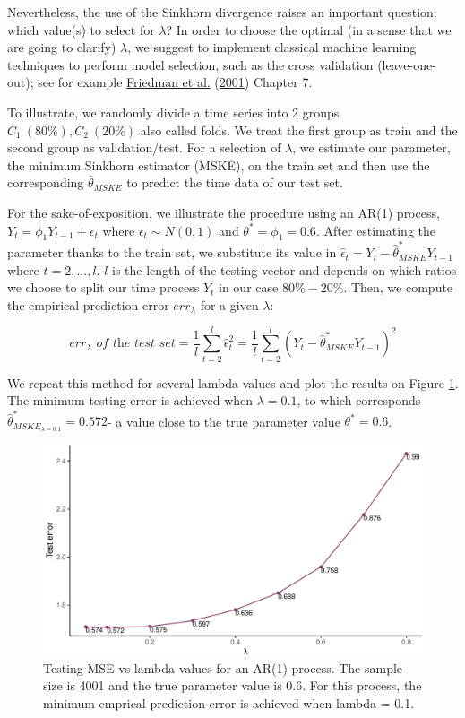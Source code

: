 \documentclass[
  11pt,
]{article}
\begin{document}
Nevertheless, the use of the Sinkhorn divergence raises an important
question: which value(s) to select for \(\lambda\)? In order to choose
the optimal (in a sense that we are going to clarify) \(\lambda\), we
suggest to implement classical machine learning techniques to perform
model selection, such as the cross validation (leave-one-out); see for
example \protect\hyperlink{ref-friedman2001elements}{Friedman et al.}
(\protect\hyperlink{ref-friedman2001elements}{2001}) Chapter 7.

To illustrate, we randomly divide a time series into \(2\) groups
\(C_1 \ (80\%), C_2 \ (20\%)\) also called folds. We treat the first
group as train and the second group as validation/test. For a selection
of \(\lambda\), we estimate our parameter, the minimum Sinkhorn
estimator (MSKE), on the train set and then use the corresponding
\(\hat \theta_{MSKE}\) to predict the time data of our test set.

For the sake-of-exposition, we illustrate the procedure using an AR(1)
process, \(Y_t = \phi_1 Y_{t-1} + \epsilon_t\) where
\(\epsilon_t \sim N(0,1)\) and \(\theta^* = \phi_1 = 0.6\). After
estimating the parameter thanks to the train set, we substitute its
value in \(\hat \epsilon_t = Y_t - \hat \theta^*_{MSKE} Y_{t-1}\) where
\(t = 2, ..., l\). \(l\) is the length of the testing vector and depends
on which ratios we choose to split our time process \({Y_t}\) in our
case \(80\% - 20\%\). Then, we compute the empirical prediction error
\(err_\lambda\) for a given \(\lambda\):

\[err_{\lambda} \textit{ of the test set} = \frac{1}{l}\sum_{t = 2}^l \hat \epsilon_t^2 = \frac{1}{l} \sum_{t = 2}^l (Y_t - \hat \theta^*_{MSKE} Y_{t-1})^2\]

We repeat this method for several lambda values and plot the results on
Figure \ref{fig:SH_CV}. The minimum testing error is achieved when
\(\lambda = 0.1\), to which corresponds
\(\hat \theta^*_{MSKE_{\lambda = 0.1}} = 0.572\)- a value close to the
true parameter value \(\theta^* = 0.6\).

\begin{figure}

{\centering \includegraphics[width=0.55\linewidth]{Master_thesis_V4_files/figure-latex/SH_CV-1} 

}

\caption{Testing MSE vs lambda values for an AR(1) process. The sample size is 4001 and the true parameter value is 0.6. For this process, the minimum emprical prediction error is achieved when lambda = 0.1.}\label{fig:SH_CV}
\end{figure}
\end{document}
